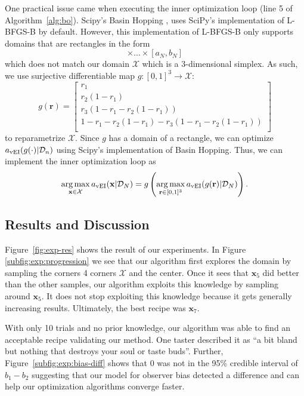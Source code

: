 One practical issue came when executing the inner optimization loop (line 5 of Algorithm~\ref{alg:bo}).
Scipy's Basin Hopping \cite{scipy, wales1997}, uses SciPy's implementation of L-BFGS-B by default.
However, this implementation of L-BFGS-B only supports domains that are rectangles in the form
\begin{equation*}[a_1, b_1] \times \ldots \times [a_N, b_N]
\end{equation*}
which does not match our domain $\mathcal{X}$ which is a 3-dimensional simplex.
As such, we use surjective differentiable map $g: [0, 1]^3 \to \mathcal{X}$:
\begin{equation*}
    g(\mathbf{r}) =
    \begin{bmatrix}
        r_1 \\
        r_2(1 - r_1) \\
        r_3(1 - r_1 - r_2(1 - r_1)) \\
           1 - r_1 - r_2(1 - r_1) - r_3(1 - r_1 - r_2(1 - r_1)) \\
    \end{bmatrix}
\end{equation*}
to reparametrize $\mathcal{X}$.
Since $g$ has a domain of a rectangle, we can optimize $a_{\mathrm{vEI}}(g(\cdot) | \mathcal{D}_n)$ using Scipy's implementation of Basin Hopping.
Thus, we can implement the inner optimization loop as
\begin{equation*}
    \operatorname*{arg\,max}_{\mathbf{x} \in \mathcal{X}} a_{\mathrm{vEI}}(\mathbf{x} | \mathcal{D}_N)
    =
    g\left(\operatorname*{arg\,max}_{\mathbf{r} \in [0, 1]^3} a_{\mathrm{vEI}}(g(\mathbf{r}) | \mathcal{D}_N)\right).
\end{equation*}

\subsection{Results and Discussion}

Figure~\ref{fig:exp-res} shows the result of our experiments.
In Figure \ref{subfig:exp:progression} we see that our algorithm first explores the domain by sampling the corners 4 corners $\mathcal{X}$ and the center.
Once it sees that $\mathbf{x}_5$ did better than the other samples, our algorithm exploits this knowledge by sampling around $\mathbf{x}_5$.
It does not stop exploiting this knowledge because it gets generally increasing results.
Ultimately, the best recipe was $\mathbf{x}_7$.

With only 10 trials and no prior knowledge, our algorithm was able to find an acceptable recipe validating our method.
One taster described it as ``a bit bland but nothing that destroys your soul or taste buds''.
Further, Figure~\ref{subfig:exp:bias-diff} shows that 0 was not in the 95\% credible interval of $b_1 - b_2$
suggesting that our model for observer bias detected a difference and can help our optimization algorithms converge faster.

